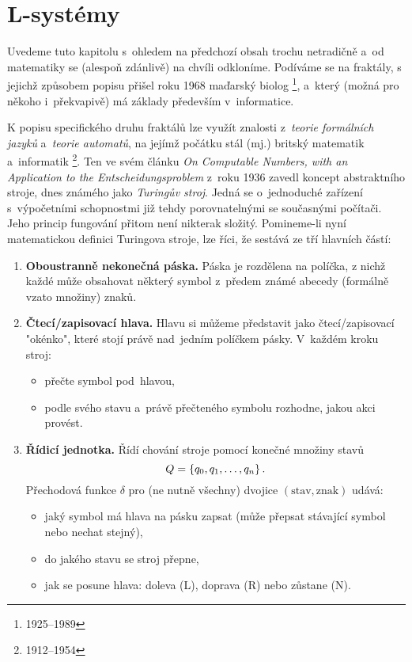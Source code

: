 \section{L-systémy}\label{sec:L-systemy}

Uvedeme tuto kapitolu s~ohledem na předchozí obsah trochu netradičně a~od matematiky se (alespoň zdánlivě) na chvíli odkloníme. Podíváme se na fraktály, s jejichž způsobem popisu přišel roku 1968 maďarský biolog \footnote{1925--1989}, a~který (možná pro někoho i~překvapivě) má základy především v~informatice. \citep[str. 2]{Prusinkiewicz1990}

K popisu specifického druhu fraktálů lze využít znalosti z~\emph{teorie formálních jazyků} a~\emph{teorie automatů}, na jejímž počátku stál (mj.) britský matematik a~informatik \footnote{1912--1954}. Ten ve svém článku \emph{On Computable Numbers, with an Application to the Entscheidungsproblem} z~roku 1936 zavedl koncept abstraktního stroje, dnes známého jako \emph{Turingův stroj}. Jedná se o~jednoduché zařízení s~výpočetními schopnostmi již tehdy porovnatelnými se současnými počítači. Jeho princip fungování přitom není nikterak složitý. Pomineme-li nyní matematickou definici Turingova stroje, lze říci, že sestává ze tří hlavních částí:
\begin{enumerate}
    \item \textbf{Oboustranně nekonečná páska.} Páska je rozdělena na políčka, z nichž každé může obsahovat některý symbol z~předem známé abecedy (formálně vzato množiny) znaků.
    \item \textbf{Čtecí/zapisovací hlava.} Hlavu si můžeme představit jako čtecí/zapisovací "okénko", které stojí právě nad~jedním políčkem pásky. V~každém kroku stroj:
    \begin{itemize}
        \item přečte symbol pod~hlavou,
        \item podle svého stavu a~právě přečteného symbolu rozhodne, jakou akci provést.
    \end{itemize}
    \item \textbf{Řídicí jednotka.} Řídí chování stroje pomocí konečné množiny stavů
    \[Q=\left\{q_0,q_1,\ldots,q_n\right\}.\]
    Přechodová funkce $\delta$ pro (ne nutně všechny) dvojice $(\text{stav},\text{znak})$ udává:
    \begin{itemize}
        \item jaký symbol má hlava na pásku zapsat (může přepsat stávající symbol nebo nechat stejný),
        \item do jakého stavu se stroj přepne,
        \item jak se posune hlava: doleva (L), doprava (R) nebo zůstane (N).
    \end{itemize}    
\end{enumerate}
